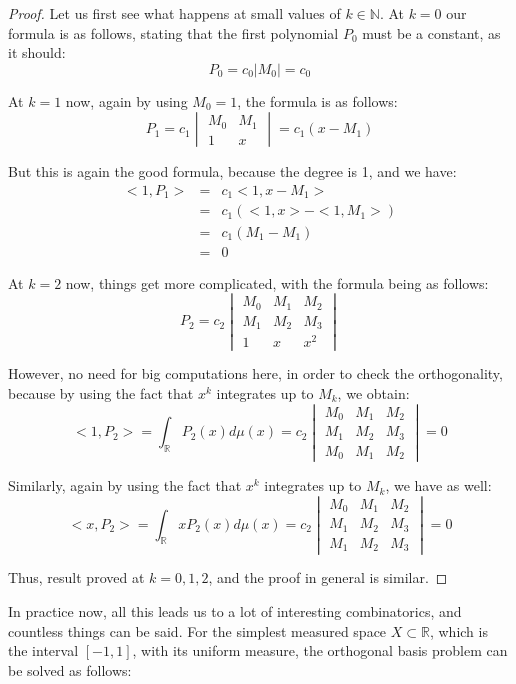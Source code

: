 \documentclass[12pt]{amsbook}
\begin{document}
\begin{proof}
Let us first see what happens at small values of $k\in\mathbb N$. At $k=0$ our formula is as follows, stating that the first polynomial $P_0$ must be a constant, as it should:
$$P_0=c_0|M_0|=c_0$$

At $k=1$ now, again by using $M_0=1$, the formula is as follows:
$$P_1=c_1\begin{vmatrix}M_0&M_1\\ 1&x\end{vmatrix}=c_1(x-M_1)$$

But this is again the good formula, because the degree is 1, and we have:
\begin{eqnarray*}
<1,P_1>
&=&c_1<1,x-M_1>\\
&=&c_1(<1,x>-<1,M_1>)\\
&=&c_1(M_1-M_1)\\
&=&0
\end{eqnarray*}

At $k=2$ now, things get more complicated, with the formula being as follows:
$$P_2=c_2\begin{vmatrix}
M_0&M_1&M_2\\
M_1&M_2&M_3\\
1&x&x^2
\end{vmatrix}$$

However, no need for big computations here, in order to check the orthogonality, because by using the fact that $x^k$ integrates up to $M_k$, we obtain:
$$<1,P_2>=\int_\mathbb RP_2(x)d\mu(x)=c_2\begin{vmatrix}
M_0&M_1&M_2\\
M_1&M_2&M_3\\
M_0&M_1&M_2
\end{vmatrix}=0$$

Similarly, again by using the fact that $x^k$ integrates up to $M_k$, we have as well:
$$<x,P_2>=\int_\mathbb RxP_2(x)d\mu(x)=c_2\begin{vmatrix}
M_0&M_1&M_2\\
M_1&M_2&M_3\\
M_1&M_2&M_3
\end{vmatrix}=0$$

Thus, result proved at $k=0,1,2$, and the proof in general is similar.
\end{proof}

In practice now, all this leads us to a lot of interesting combinatorics, and countless things can be said. For the simplest measured space $X\subset\mathbb R$, which is the interval $[-1,1]$, with its uniform measure, the orthogonal basis problem can be solved as follows:
\end{document}
